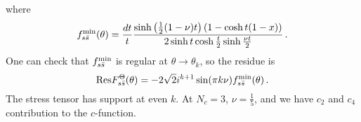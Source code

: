 \documentclass[12pt]{article}
\newcommand{\Nc}{N_c}
\begin{document}
    where 
    \begin{equation}
    f^{\rm min}_{s \bar s} (\theta) = 
    \frac{dt}{t}
    \frac{\sinh \left( \frac{1}{2} (1-\nu ) t \right) (1-\cosh t (1-x))}{2 \sinh t \cosh \frac{t}{2} \sinh \frac{\nu  t}{2}} \, .
    \end{equation}
    One can check that $f^{\rm min}_{s \bar s}$ is regular at $\theta\rightarrow\theta_k$, so the residue is 
    \begin{equation}
    {\rm Res}F_{s\bar s}^{\Theta} (\theta) = -2\sqrt{2} i^{k+1} \sin (\pi  k \nu ) f^{\rm min}_{s \bar s} (\theta) \, .
    \end{equation}
    The stress tensor has support at even $k$. At $\Nc = 3$, $\nu = \frac{1}{5}$, and we have $c_2$ and $c_4$ contribution to the $c$-function.


 
 


\end{document}
